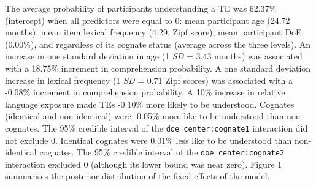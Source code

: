 \documentclass[
  english,
  man,man,floatsintext]{apa6}
\begin{document}
The average probability of participants understanding a TE was 62.37\% (intercept) when all predictors were equal to 0: mean participant age (24.72 months), mean item lexical frequency (4.29, Zipf score), mean participant DoE (0.00\%), and regardless of its cognate status (average across the three levels). An increase in one standard deviation in age (1 \emph{SD} = 3.43 months) was associated with a 18.75\% increment in comprehension probability. A one standard deviation increase in lexical frequency (1 \emph{SD} = 0.71 Zipf scores) was associated with a -0.08\% increment in comprehension probability. A 10\% increase in relative language exposure made TEs -0.10\% more likely to be understood. Cognates (identical and non-identical) were -0.05\% more like to be understood than non-cognates. The 95\% credible interval of the \texttt{doe\_center:cognate1} interaction did not exclude 0. Identical cognates were 0.01\% less like to be understood than non-identical cognates. The 95\% credible interval of the \texttt{doe\_center:cognate2} interaction excluded 0 (although its lower bound was near zero). Figure 1 summarises the posterior distribution of the fixed effects of the model.
\end{document}
